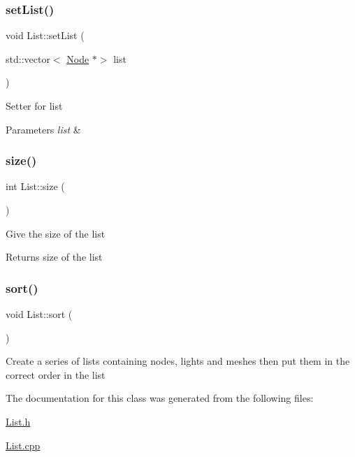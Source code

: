\subsubsection{\texorpdfstring{set\+List()}{setList()}}
{\footnotesize\ttfamily void List\+::set\+List (\begin{DoxyParamCaption}\item[{std\+::vector$<$ \hyperlink{classNode}{Node} $\ast$$>$}]{list }\end{DoxyParamCaption})}

Setter for list 
\begin{DoxyParams}{Parameters}
{\em list} & \\
\hline
\end{DoxyParams}
\mbox{\label{classList_a86141be078d5fac15c1b7f402173a30f}} 
\subsubsection{\texorpdfstring{size()}{size()}}
{\footnotesize\ttfamily int List\+::size (\begin{DoxyParamCaption}{ }\end{DoxyParamCaption})}

Give the size of the list \begin{DoxyReturn}{Returns}
size of the list 
\end{DoxyReturn}
\mbox{\label{classList_a397e04de01f7a13691a7714a29e9b511}} 
\subsubsection{\texorpdfstring{sort()}{sort()}}
{\footnotesize\ttfamily void List\+::sort (\begin{DoxyParamCaption}{ }\end{DoxyParamCaption})}

Create a series of lists containing nodes, lights and meshes then put them in the correct order in the list 

The documentation for this class was generated from the following files\+:\begin{DoxyCompactItemize}
\item 
\hyperlink{List_8h}{List.\+h}\item 
\hyperlink{List_8cpp}{List.\+cpp}\end{DoxyCompactItemize}
